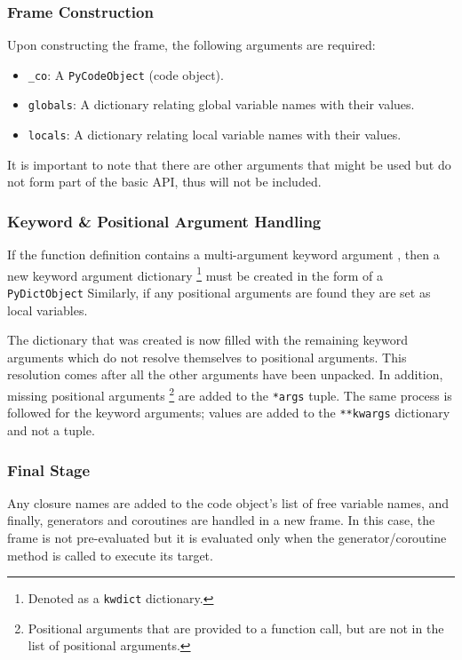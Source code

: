 \documentclass[12pt, a4paper]{report}
\theoremstyle{definition}
\theoremstyle{definition}%
\theoremstyle{definition}%
\theoremstyle{definition}%
\theoremstyle{definition}%
\theoremstyle{definition}%
\begin{document}
{            \subsubsection*{Frame Construction}
            \par Upon constructing the frame, the following arguments are required:
            \begin{itemize}
                \item \lstinline|_co|: A \lstinline|PyCodeObject| (code object).
                \item \lstinline|globals|: A dictionary relating global variable names with their values.
                \item \lstinline|locals|: A dictionary relating local variable names with their values.
            \end{itemize}
            It is important to note that there are other arguments that might be used but do not form part of the basic API, thus will not be included.

            \subsubsection*{Keyword \& Positional Argument Handling}
            \par If the function definition contains a multi-argument keyword argument , then a new keyword argument dictionary \footnote{\label{footnote:kwdict_dict}Denoted as a \lstinline|kwdict| dictionary.} must be created in the form of a \lstinline|PyDictObject|
            Similarly, if any positional arguments are found they are set as local variables.

            \par The dictionary that was created is now filled with the remaining keyword arguments which do not resolve themselves to positional arguments. This resolution comes after
            all the other arguments have been unpacked. In addition, missing positional arguments \footnote{Positional arguments that are provided to a function call, but are not in the list of positional arguments.} are 
            added to the \lstinline|*args| tuple. The same process is followed for the keyword arguments; values are added to the \lstinline|**kwargs| dictionary and not a tuple.

            \subsubsection*{Final Stage}
            \par Any closure names are added to the code object's list of free variable names, and finally, generators and coroutines are handled in a new frame. In this case, the frame is not pre-evaluated but it is 
            evaluated only when the generator/coroutine method is called to execute its target.


}
\end{document}
